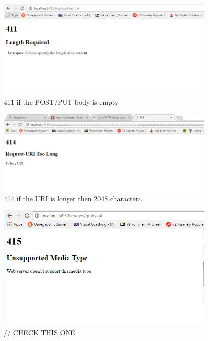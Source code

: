 \documentclass[a4paper,12pt]{article}
\numberwithin{figure}{section}
\begin{document}
\begin{figure}[h!]
	\centering
	\label{411}
	\includegraphics[width=0.95\textwidth,keepaspectratio]{img/411.jpg} 
	\caption{411 if the POST/PUT body is empty}
\end{figure}

\begin{figure}[h!]
	\centering
	\label{414}
	\includegraphics[width=0.95\textwidth,keepaspectratio]{img/414.jpg} 
	\caption{414 if the URI is longer then 2048 characters.}
\end{figure}

\begin{figure}[h!]
	\centering
	\label{415}
	\includegraphics[width=0.95\textwidth,keepaspectratio]{img/415.jpg} 
	\caption{// CHECK THIS ONE  }
\end{figure}
\end{document}

